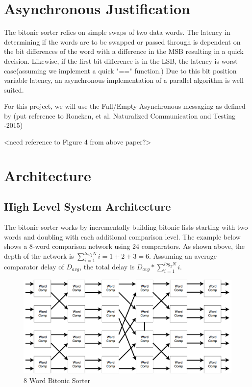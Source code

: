 \documentclass[11pt]{scrartcl}
\begin{document}
\section{Asynchronous Justification}
The bitonic sorter relies on simple swaps of two data words. The latency in determining if the words are to be swapped or passed through is dependent on the bit differences of the word with a difference in the MSB resulting in a quick decision. Likewise, if the first bit difference is in the LSB, the latency is worst case(assuming we implement a quick "==" function.)
Due to this bit position variable latency, an asynchronous implementation of a parallel algorithm is well suited.

For this project, we will use the Full/Empty Asynchronous messaging as defined by (put reference to Roncken, et al.  Naturalized Communication and Testing -2015)

<need reference to Figure 4 from above paper?>\\

\section{Architecture}
\subsection{High Level System Architecture}
The bitonic sorter works by incrementally building bitonic lists starting with two words and doubling with each additional comparison level.  The example below shows a 8-word comparison network using 24 comparators. As shown above, the depth of the network is $\sum_{i=1}^{log_2N} i  = 1 + 2 + 3 = 6$. Assuming an average comparator delay of $D_{avg}$, the total delay is $D_{avg} * \sum_{i=1}^{log_2N} i$.


\begin{figure}[hbtp]
\centering
\includegraphics[scale=.40]{8_Word_Bitonic_Sorter_Diagram.png}
\caption{8 Word Bitonic Sorter}
\end{figure}
\end{document}
